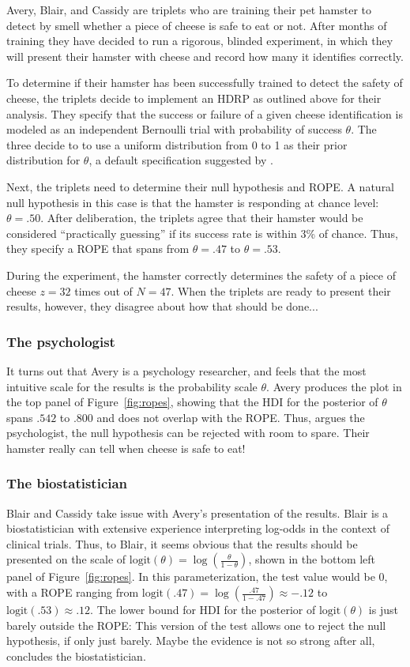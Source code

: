 \documentclass[man]{apa}
\newcommand{\hdr}{HDRP}
\newcommand{\logit}{\text{logit}}
\begin{document}
Avery, Blair, and Cassidy are triplets who are training their pet hamster to detect by smell whether a piece of cheese is safe to eat or not. After months of training they have decided to run a rigorous, blinded experiment, in which they will present their hamster with cheese and record how many it identifies correctly.

To determine if their hamster has been successfully trained to detect the safety of cheese, the triplets decide to implement an \hdr{} as outlined above for their analysis. They specify that the success or failure of a given cheese identification is modeled as an independent Bernoulli trial with probability of success $\theta$. The three decide to to use a uniform distribution from 0 to 1 as their prior distribution for $\theta$, a default specification suggested by . 

Next, the triplets need to determine their null hypothesis and ROPE. A natural null hypothesis in this case is that the hamster is responding at chance level: $\theta=.50$. After deliberation, the triplets agree that their hamster would be considered ``practically guessing'' if its success rate is within 3\% of chance. Thus, they specify a ROPE that spans from $\theta=.47$ to $\theta=.53$.

During the experiment, the hamster correctly determines the safety of a piece of cheese $z=32$ times out of $N=47$. When the triplets are ready to present their results, however, they disagree about how that should be done...

\subsubsection{The psychologist} It turns out that Avery is a psychology researcher, and feels that the most intuitive scale for the results is the probability scale $\theta$. Avery produces the plot in the top panel of Figure~\ref{fig:ropes}, showing that the HDI for the posterior of $\theta$ spans $.542$ to $.800$ and does not overlap with the ROPE.  Thus, argues the psychologist, the null hypothesis can be rejected with room to spare. Their hamster really can tell when cheese is safe to eat!

\subsubsection{The biostatistician} Blair and Cassidy take issue with Avery's presentation of the results. Blair is a biostatistician with extensive experience interpreting log-odds in the context of clinical trials. Thus, to Blair, it seems obvious that the results should be presented on the scale of $\logit(\theta)=\log\left(\frac{\theta}{1-\theta}\right)$, shown in the bottom left panel of Figure~\ref{fig:ropes}. In this parameterization, the test value would be 0, with a ROPE ranging from $\logit(.47)=\log\left(\frac{.47}{1-.47}\right)\approx-.12$ to $\logit(.53)\approx.12$. The lower bound for HDI for the posterior of $\logit(\theta)$ is just barely outside the ROPE: This version of the test allows one to reject the null hypothesis, if only just barely. Maybe the evidence is not so strong after all, concludes the biostatistician. 
\end{document}
